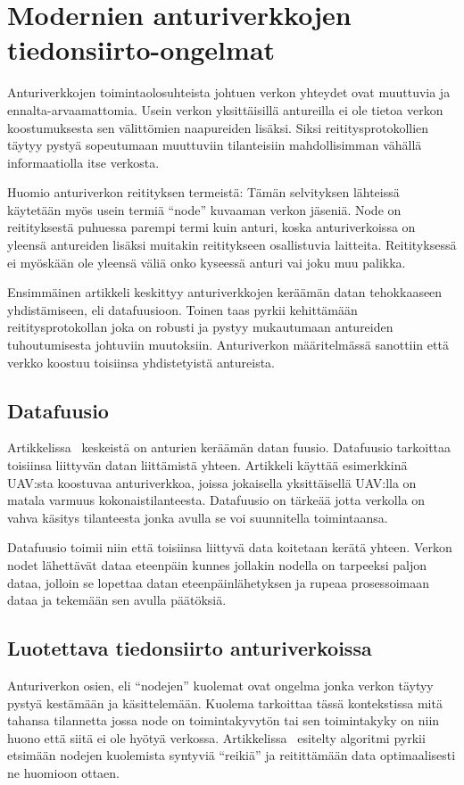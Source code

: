 \section{Modernien anturiverkkojen tiedonsiirto-ongelmat}

Anturiverkkojen toimintaolosuhteista johtuen verkon yhteydet ovat muuttuvia ja
ennalta-arvaamattomia. Usein verkon yksittäisillä antureilla ei ole tietoa
verkon koostumuksesta sen välittömien naapureiden lisäksi. Siksi
reititysprotokollien täytyy pystyä sopeutumaan muuttuviin tilanteisiin
mahdollisimman vähällä informaatiolla itse verkosta.

Huomio anturiverkon reitityksen termeistä: Tämän selvityksen lähteissä
käytetään myös usein termiä ``node'' kuvaaman verkon jäseniä. Node on
reitityksestä puhuessa parempi termi kuin anturi, koska anturiverkoissa on
yleensä antureiden lisäksi muitakin reititykseen osallistuvia laitteita.
Reitityksessä ei myöskään ole yleensä väliä onko kyseessä anturi vai joku muu
palikka.

Ensimmäinen artikkeli keskittyy anturiverkkojen keräämän datan tehokkaaseen
yhdistämiseen, eli datafuusioon. Toinen taas pyrkii kehittämään
reititysprotokollan joka on robusti ja pystyy mukautumaan antureiden
tuhoutumisesta johtuviin muutoksiin. Anturiverkon määritelmässä sanottiin että
verkko koostuu toisiinsa yhdistetyistä antureista.

\subsection{Datafuusio}
Artikkelissa~\cite{Yu2006} keskeistä on anturien keräämän datan fuusio.
Datafuusio tarkoittaa toisiinsa liittyvän datan liittämistä yhteen. Artikkeli
käyttää esimerkkinä UAV:sta koostuvaa anturiverkkoa, joissa jokaisella
yksittäisellä UAV:lla on matala varmuus kokonaistilanteesta. Datafuusio on
tärkeää jotta verkolla on vahva käsitys tilanteesta jonka avulla se voi
suunnitella toimintaansa.

Datafuusio toimii niin että toisiinsa liittyvä data koitetaan kerätä yhteen.
Verkon nodet lähettävät dataa eteenpäin kunnes jollakin nodella on tarpeeksi
paljon dataa, jolloin se lopettaa datan eteenpäinlähetyksen ja rupeaa
prosessoimaan dataa ja tekemään sen avulla päätöksiä.

\subsection{Luotettava tiedonsiirto anturiverkoissa}
Anturiverkon osien, eli ``nodejen'' kuolemat ovat ongelma jonka verkon täytyy
pystyä kestämään ja käsittelemään. Kuolema tarkoittaa tässä kontekstissa mitä
tahansa tilannetta jossa node on toimintakyvytön tai sen toimintakyky on niin
huono että siitä ei ole hyötyä verkossa. Artikkelissa~\cite{Arya2015} esitelty
algoritmi pyrkii etsimään nodejen kuolemista syntyviä ``reikiä'' ja reitittämään
data optimaalisesti ne huomioon ottaen.

